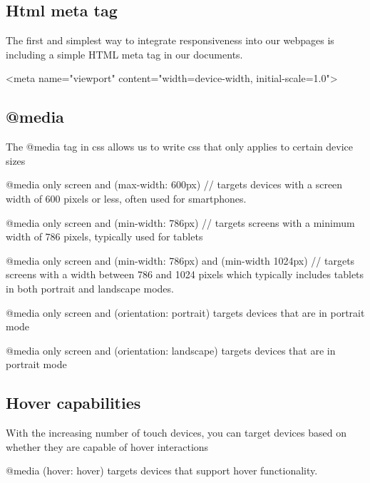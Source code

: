 \documentclass{report}
\begin{document}
    \subsection{Html meta tag}
    \bigbreak \noindent 
    The first and simplest way to integrate responsiveness into our webpages is including a simple HTML meta tag in our documents.
    \begin{htmlcode}
<meta name="viewport" content="width=device-width, initial-scale=1.0">
    \end{htmlcode}

    \bigbreak \noindent 
    \subsection{@media}
    \bigbreak \noindent 
    \begin{concept}
        The @media tag in css allows us to write css that only applies to certain device sizes        
    \end{concept}
    \bigbreak \noindent 
    \begin{csscode}

        @media only screen and (max-width: 600px) {
            // targets devices with a screen width of 600 pixels or less, often used for smartphones.
        }

        @media only screen and (min-width: 786px) {
            // targets screens with a minimum width of 786 pixels, typically used for tablets
        }

        @media only screen and (min-width: 786px) and (min-width 1024px) {
            // targets screens with a width between 786 and 1024 pixels  which typically includes tablets in both portrait and landscape modes.
        }


        @media only screen and (orientation: portrait) {
            targets devices that are in portrait mode
        }

        @media only screen and (orientation: landscape) {
            targets devices that are in portrait mode
        }
    \end{csscode}

    \pagebreak \bigbreak \noindent 
    \subsection{Hover capabilities}
    \bigbreak \noindent 
    \begin{concept}
        With the increasing number of touch devices, you can target devices based on whether they are capable of hover interactions
        \bigbreak \noindent 
        \begin{csscode}
            @media (hover: hover) {
                targets devices that support hover functionality.
            }
        \end{csscode}
    \end{concept}
\end{document}
